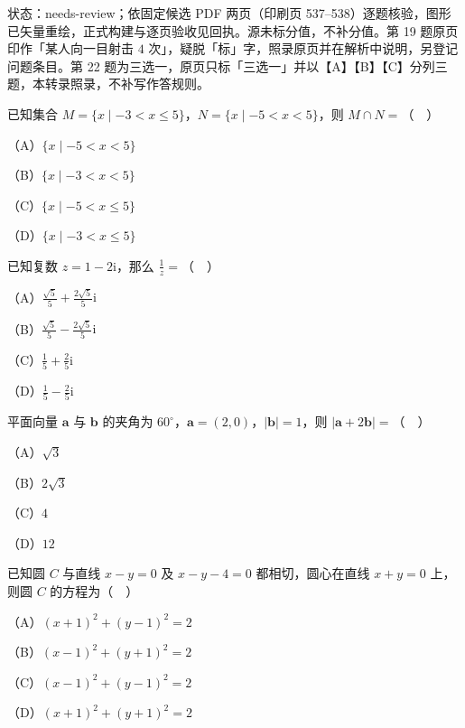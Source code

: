 

状态：needs-review；依固定候选 PDF 两页（印刷页 537–538）逐题核验，图形已矢量重绘，正式构建与逐页验收见回执。源未标分值，不补分值。第 19 题原页印作「某人向一目射击 $4$ 次」，疑脱「标」字，照录原页并在解析中说明，另登记问题条目。第 22 题为三选一，原页只标「三选一」并以【A】【B】【C】分列三题，本转录照录，不补写作答规则。


\begin{question}
已知集合 $M=\{x\mid -3<x\leqslant5\}$，$N=\{x\mid -5<x<5\}$，则 $M\cap N=$（　）

（A）$\{x\mid -5<x<5\}$

（B）$\{x\mid -3<x<5\}$

（C）$\{x\mid -5<x\leqslant5\}$

（D）$\{x\mid -3<x\leqslant5\}$

\end{question}
\begin{question}
已知复数 $z=1-2\mathrm i$，那么 $\frac1z=$（　）

（A）$\frac{\sqrt5}{5}+\frac{2\sqrt5}{5}\mathrm i$

（B）$\frac{\sqrt5}{5}-\frac{2\sqrt5}{5}\mathrm i$

（C）$\frac15+\frac25\mathrm i$

（D）$\frac15-\frac25\mathrm i$

\end{question}
\begin{question}
平面向量 $\boldsymbol a$ 与 $\boldsymbol b$ 的夹角为 $60^\circ$，$\boldsymbol a=(2,0)$，$|\boldsymbol b|=1$，则 $|\boldsymbol a+2\boldsymbol b|=$（　）

（A）$\sqrt3$

（B）$2\sqrt3$

（C）$4$

（D）$12$

\end{question}
\begin{question}
已知圆 $C$ 与直线 $x-y=0$ 及 $x-y-4=0$ 都相切，圆心在直线 $x+y=0$ 上，则圆 $C$ 的方程为（　）

（A）$(x+1)^2+(y-1)^2=2$

（B）$(x-1)^2+(y+1)^2=2$

（C）$(x-1)^2+(y-1)^2=2$

（D）$(x+1)^2+(y+1)^2=2$

\end{question}
